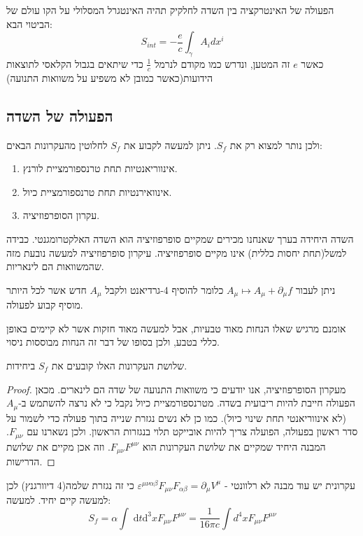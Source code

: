 \documentclass{tstextbook}
\begin{document}
הפעולה של האינטרקציה בין השדה לחלקיק תהיה האינטגרל המסלולי על הקו עולם של הביטוי הבא:
$$S_{int}=-\frac{e}{c} \int_{\gamma} A_{i} dx^i$$
כאשר \(e\) זה המטען, ונדרש כמו מקודם לנרמל \(\frac{1}{c}\) כדי שיתאים בגבול הקלאסי לתוצאות הידועות(כאשר כמובן לא משפיע על משוואות התנועה)

\subsection{הפעולה של השדה}

ולכן נותר למצוא רק את \(S_{f}\). ניתן למעשה לקבוע את \(S_{f}\) לחלוטין מהעקרונות הבאים:

\begin{enumerate}
  \item אינווריאנטיות תחת טרנספורמציית לורנץ. 


  \item אינוואירנטיות תחת טרנספורמציית כיול. 


  \item עקרון הסופרפוזיציה.  


\end{enumerate}
\begin{remark}
השדה היחידה בערך שאנחנו מכירים שמקיים סופרפוזיציה הוא השדה האלקטרומגנטי. כבידה למשל(תחת יחסות כללית) אינו מקיים סופרפוזיציה. עיקרון סופרפוזיציה למעשה נובעת מזה שהמשוואות הם לינאריות.

\end{remark}
\begin{definition}
ניתן לעבור \(A_{\mu}\mapsto A_{\mu}+\partial_{\mu}f\) כלומר להוסיף 4-גרדיאנט ולקבל \(A_{\mu}\) חדש אשר לכל היותר מוסיף קבוע לפעולה.

\end{definition}
אומנם מרגיש שאלו הנחות מאוד טבעיות, אבל למעשה מאוד חזקות אשר לא קיימים באופן כללי בטבע, ולכן בסופו של דבר זה הנחות מבוססות ניסוי.

\begin{proposition}
שלושת העקרונות האלו קובעים את \(S_{f}\) ביחידות.

\end{proposition}
\begin{proof}
מעקרון הסופרפוזיציה, אנו יודעים כי משוואות התנועה של שדה הם לינארים. מכאן הפעולה חייבת להיות ריבועית בשדה. 
מטרנספורמציית כיול נקבל כי לא נרצה להשתמש ב-\(A_{\mu}\)(לא אינווריאנטי תחת שינוי כיול).
כמו כן לא נשים נגזרת שנייה בתוך פעולה כדי לשמור על סדר ראשון בפעולה, הפועלה צריך להיות אובייקט תלוי בנגזרות הראשון. ולכן נשארנו עם \(F_{\mu \nu}\). 
המבנה היחיד שמקיים את שלושת העקרונות הוא \(F_{\mu \nu}F^{\mu \nu}\). וזה אכן מקיים את שלושת הדרישות. 

\end{proof}
עקרונית יש עוד מבנה לא רלוונטי - \(\varepsilon^{\mu \nu \alpha \beta}F_{\mu \nu}F_{\alpha \beta}=\partial_{\mu}V^\mu\) כי זה נגזרת שלמה(4 דיוורגנץ)
לכן למעשה קיים יחיד. למעשה:
$$S_{f}=\alpha\int \;\mathrm{d}t\mathrm{d}^3xF_{\mu \nu}F^{\mu \nu}=\frac{1}{16\pi c}\int d^4x F_{\mu \nu}F^{\mu \nu}$$
\end{document}
